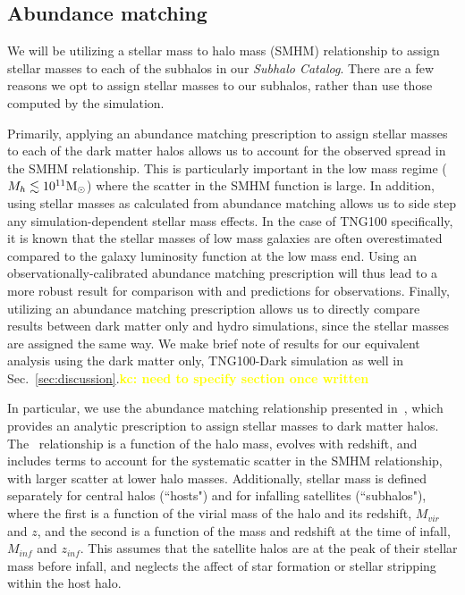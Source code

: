 \documentclass[twocolumn]{aastex631}
\newcommand{\kc}[1]{\textcolor{yellow}{\textbf{kc: #1}} }
\newcommand{\subcat}{\textit{Subhalo Catalog}}
\begin{document}
    \subsection{Abundance matching} \label{sec:methods-am}
    We will be utilizing a stellar mass to halo mass (SMHM) relationship to assign stellar masses to each of the subhalos in our \subcat.  
    There are a few reasons we opt to assign stellar masses to our subhalos, rather than use those computed by the simulation. 

    Primarily, applying an abundance matching prescription to assign stellar masses to each of the dark matter halos allows us to account for the observed spread in the SMHM relationship. 
    This is particularly important in the low mass regime ($M_h \lesssim 10^{11}\mathrm{M}_\odot$) where the scatter in the SMHM function is large. 
    In addition, using stellar masses as calculated from abundance matching allows us to side step any simulation-dependent stellar mass effects.
    In the case of TNG100 specifically, it is known that the stellar masses of low mass galaxies are often overestimated compared to the galaxy luminosity function at the low mass end\cite{}. 
    Using an observationally-calibrated abundance matching prescription will thus lead to a more robust result for comparison with and predictions for observations. 
    Finally, utilizing an abundance matching prescription allows us to directly compare results between dark matter only and hydro simulations, since the stellar masses are assigned the same way. 
    We make brief note of results for our equivalent analysis using the dark matter only, TNG100-Dark simulation as well in Sec.~\ref{sec:discussion}.\kc{need to specify section once written}
    
    In particular, we use the abundance matching relationship presented in~\citet{Moster2013}, which provides an analytic prescription to assign stellar masses to dark matter halos. 
    The~\citet{Moster2013} relationship is a function of the halo mass, evolves with redshift, and includes terms to account for the systematic scatter in the SMHM relationship, with larger scatter at lower halo masses.
    Additionally, stellar mass is defined separately for central halos (``hosts") and for infalling satellites (``subhalos"), where the first is a function of the virial mass of the halo and its redshift, $M_{vir}$ and $z$, and the second is a function of the mass and redshift at the time of infall, $M_{inf}$ and $z_{inf}$. 
    This assumes that the satellite halos are at the peak of their stellar mass before infall, and neglects the affect of star formation or stellar stripping within the host halo. 
\end{document}
